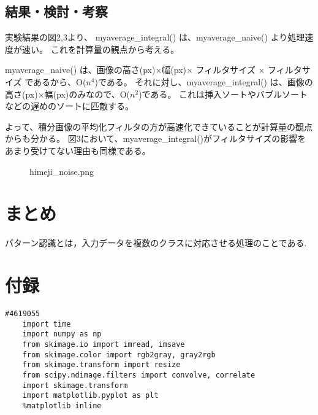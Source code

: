 \documentclass[12pt]{jarticle}
\begin{document}
\clearpage
\subsection{結果・検討・考察}
実験結果の図2,3より、
myaverage\_integral() は、myaverage\_naive() より処理速度が速い。
これを計算量の観点から考える。

myaverage\_naive() は、画像の高さ(px)$\times$幅(px)$\times$ フィルタサイズ $\times$ フィルタサイズ
であるから、O($n^4$)である。
それに対し、myaverage\_integral() は、画像の高さ(px)$\times$幅(px)のみなので、O($n^2$)である。
これは挿入ソートやバブルソートなどの遅めのソートに匹敵する。

よって、積分画像の平均化フィルタの方が高速化できていることが計算量の観点からも分かる。
図3において、myaverage\_integral()がフィルタサイズの影響をあまり受けてない理由も同様である。




\begin{figure}[h]
    \begin{center}
    \end{center}
    \caption{himeji\_noise.png}
\end{figure}

\section{まとめ}
パターン認識とは，入力データを複数のクラスに対応させる処理のことである.

\clearpage
\appendix
\section{付録}

\begin{lstlisting}[style = py,caption=kadai1]
    #4619055
    import time
    import numpy as np
    from skimage.io import imread, imsave
    from skimage.color import rgb2gray, gray2rgb
    from skimage.transform import resize
    from scipy.ndimage.filters import convolve, correlate
    import skimage.transform
    import matplotlib.pyplot as plt
    %matplotlib inline
\end{lstlisting}


\end{document}
